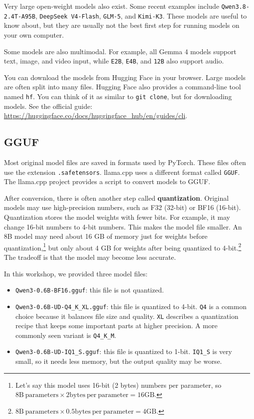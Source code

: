 \documentclass[a4paper,12pt]{article}
\begin{document}
Very large open-weight models also exist. Some recent examples include \texttt{Qwen3.8-2.4T-A95B}, \texttt{DeepSeek V4-Flash}, \texttt{GLM-5}, and \texttt{Kimi-K3}. These models are useful to know about, but they are usually not the best first step for running models on your own computer.

Some models are also multimodal. For example, all Gemma 4 models support text, image, and video input, while \texttt{E2B}, \texttt{E4B}, and \texttt{12B} also support audio.

You can download the models from Hugging Face in your browser. Large models are often split into many files. Hugging Face also provides a command-line tool named \texttt{hf}. You can think of it as similar to \verb|git clone|, but for downloading models. See the official guide: \url{https://huggingface.co/docs/huggingface_hub/en/guides/cli}.

\subsection{GGUF}
\label{sec:gguf}

Most original model files are saved in formats used by PyTorch. These files often use the extension \texttt{.safetensors}. llama.cpp uses a different format called \texttt{GGUF}. The llama.cpp project provides a script to convert models to GGUF.

After conversion, there is often another step called \textbf{quantization}. Original models may use high-precision numbers, such as F32 (32-bit) or BF16 (16-bit). Quantization stores the model weights with fewer bits. For example, it may change 16-bit numbers to 4-bit numbers. This makes the model file smaller. An 8B model may need about 16 GB of memory just for weights before quantization,\footnote{Let's say this model uses 16-bit (2 bytes) numbers per parameter, so $8 \mathrm{B}\ \mathrm{parameters} \times 2 \mathrm{bytes\ per\ parameter} = 16 \mathrm{GB}$.} but only about 4 GB for weights after being quantized to 4-bit.\footnote{$8 \mathrm{B}\ \mathrm{parameters} \times 0.5 \mathrm{bytes\ per\ parameter} = 4 \mathrm{GB}$.} The tradeoff is that the model may become less accurate.

In this workshop, we provided three model files:

\begin{itemize}
\item \texttt{Qwen3-0.6B-BF16.gguf}: this file is not quantized.
\item \texttt{Qwen3-0.6B-UD-Q4\_K\_XL.gguf}: this file is quantized to 4-bit. \texttt{Q4} is a common choice because it balances file size and quality. \texttt{XL} describes a quantization recipe that keeps some important parts at higher precision. A more commonly seen variant is \texttt{Q4\_K\_M}.
\item \texttt{Qwen3-0.6B-UD-IQ1\_S.gguf}: this file is quantized to 1-bit. \texttt{IQ1\_S} is very small, so it needs less memory, but the output quality may be worse.
\end{itemize}
\end{document}
